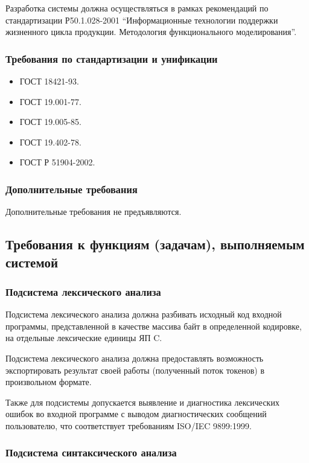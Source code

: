 \documentclass[14pt,russian]{extarticle}
\begin{document}
Разработка системы должна осуществляться в рамках рекомендаций по стандартизации Р50.1.028-2001 \enquote{Информационные технологии поддержки жизненного цикла продукции. Методология функционального моделирования}.

\subsubsection{Требования по стандартизации и унификации}

\begin{itemize}
	\item ГОСТ 18421-93.
	\item ГОСТ 19.001-77.
	\item ГОСТ 19.005-85.
	\item ГОСТ 19.402-78.
	\item ГОСТ Р 51904-2002.
\end{itemize}

\subsubsection{Дополнительные требования}

Дополнительные требования не предъявляются.

\subsection{Требования к функциям (задачам), выполняемым\\системой}

\subsubsection{Подсистема лексического анализа}

Подсистема лексического анализа должна разбивать исходный код входной программы,
представленной в качестве массива байт в определенной кодировке, на отдельные
лексические единицы ЯП C.

Подсистема лексического анализа должна предоставлять возможность экспортировать
результат своей работы (полученный поток токенов) в произвольном формате.

Также для подсистемы допускается выявление и диагностика лексических ошибок во
входной программе с выводом диагностических сообщений пользователю, что
соответствует требованиям ISO/IEC 9899:1999.

\subsubsection{Подсистема синтаксического анализа}
\end{document}
